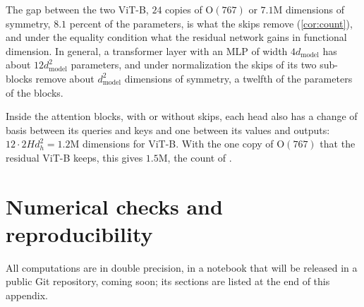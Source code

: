 \documentclass[10pt]{article}
\theoremstyle{definition}
\theoremstyle{remark}
\newcommand{\dm}{d_{\mathrm{model}}}
\newcommand{\Ort}{\mathrm{O}}
\begin{document}
The gap between the two ViT-B, $24$ copies of $\Ort(767)$ or $7.1$M dimensions of symmetry, $8.1$ percent of the parameters, is what the skips remove (\cref{cor:count}), and under the equality condition what the residual network gains in functional dimension. In general, a transformer layer with an MLP of width $4\dm$ has about $12\dm^2$ parameters, and under normalization the skips of its two sub-blocks remove about $\dm^2$ dimensions of symmetry, a twelfth of the parameters of the blocks.

Inside the attention blocks, with or without skips, each head also has a change of basis between its queries and keys and one between its values and outputs: $12 \cdot 2Hd_h^2 = 1.2$M dimensions for ViT-B. With the one copy of $\Ort(767)$ that the residual ViT-B keeps, this gives $1.5$M, the count of \citet[Eq.~17]{vannierop2024gauge}.

\FloatBarrier
\section{Numerical checks and reproducibility}\label{app:checks}

All computations are in double precision, in a notebook that will be released in a public Git repository, coming soon; its sections are listed at the end of this appendix.
\end{document}
